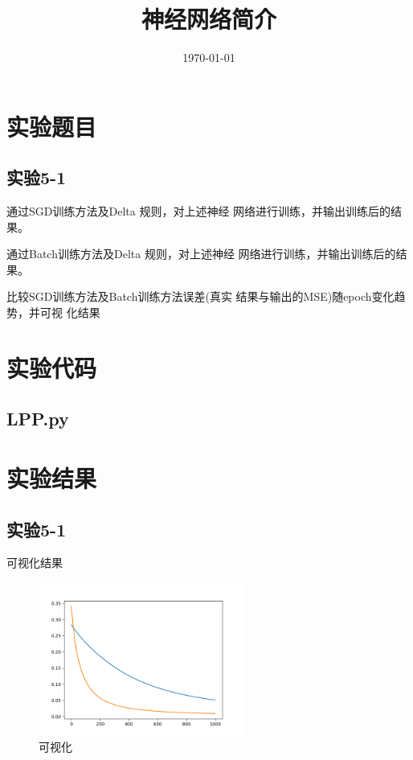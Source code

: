 \documentclass{../source/Experiment}
\title{神经网络简介}
\date{\today}
\begin{document}
\makecover
\section{实验题目}
\subsection{实验5-1}
通过SGD训练方法及Delta 规则，对上述神经
网络进行训练，并输出训练后的结果。

通过Batch训练方法及Delta 规则，对上述神经
网络进行训练，并输出训练后的结果。

比较SGD训练方法及Batch训练方法误差(真实
结果与输出的MSE)随epoch变化趋势，并可视
化结果

\section{实验代码}
\subsection{LPP.py}



\section{实验结果}
\subsection{实验5-1}
可视化结果
\begin{figure}[H]
    \centering
    \includegraphics[width = 0.6\textwidth]{Part5/5-1.png}
    \caption{可视化}
\end{figure}
\end{document}
